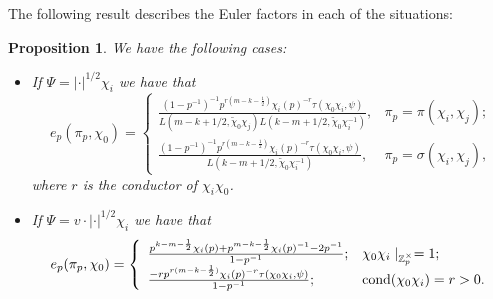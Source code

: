 \documentclass{amsart}
\newtheorem{prop0}[defn0]{Proposition}
\newenvironment{proposition}{\begin{prop0}}{\end{prop0}}
\newcommand{\Z}{{\mathbb Z}}
\begin{document}
The following result describes the Euler factors in each of the situations:
\begin{proposition}\label{EulerFactors}
We have the following cases:
\begin{itemize}
\item[$(i)$] If $\Psi=|\cdot|^{1/2}\chi_i$ we have that
\[
e_p(\pi_p,\chi_0)=\left\{\begin{array}{lc}
\frac{(1-p^{-1})^{-1}p^{r(m-k-\frac{1}{2})}\chi_i(p)^{-r}\tau(\chi_0\chi_i,\psi)}{L(m-k+1/2,\tilde\chi_0\chi_j)L(k-m+1/2,\tilde\chi_0\chi_i^{-1})},&\pi_p=\pi(\chi_i,\chi_j);\\
\frac{(1-p^{-1})^{-1}p^{r(m-k-\frac{1}{2})}\chi_i(p)^{-r}\tau(\chi_0\chi_i,\psi)}{L(k-m+1/2,\tilde\chi_0\chi_i^{-1})},&\pi_p=\sigma(\chi_i,\chi_j),
\end{array}
\right.
\]
where $r$ is the conductor of $\chi_i\chi_0$.

\item[$(ii)$] If $\Psi=v\cdot|\cdot|^{1/2}\chi_i$ we have that
\[
e_p(\pi_p,\chi_0)=\left\{\begin{array}{ll}
\frac{p^{k-m-\frac{1}{2}}\chi_i(p)+p^{m-k-\frac{1}{2}}\chi_i(p)^{-1}-2p^{-1}}{1-p^{-1}};&\chi_0\chi_i\mid_{\Z_p^\times}=1;\\
\frac{-rp^{r(m-k-\frac{1}{2})}\chi_i(p)^{-r}\tau(\chi_0\chi_i,\psi)}{1-p^{-1}};&{\rm cond}(\chi_0\chi_i)=r>0.
\end{array}\right.
\]
\end{itemize}
\end{proposition}
\end{document}
